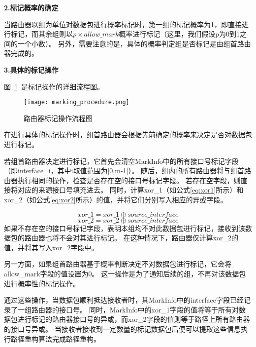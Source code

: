 \textbf{2.标记概率的确定}\par
当路由器以组为单位对数据包进行概率标记时，第一组的标记概率为1，即直接进行标记，而其余组则以$p \times allow\_mark$概率进行标记（这里，我们假设p为0到1之间的一个小数）。
另外，需要注意的是，具体的概率判定组是否标记是由组首路由器完成的。
\par

\textbf{3.具体的标记操作}\par
图~\ref{fig:marking_procedure}~是标记操作的详细流程图。
\begin{figure}[h]
  \centering
  \texttt{[image: marking\_procedure.png]}
  \caption{路由器标记操作流程图}
  \label{fig:marking_procedure}
\end{figure}  
在进行具体的标记操作时，组首路由器会根据先前确定的概率来决定是否对数据包进行标记。\par
若组首路由器决定进行标记，它首先会清空MarkInfo中的所有接口号标记字段（即interface\_i，其中i取值范围为[0,m-1]）。
随后，组内的所有路由器将与组首路由器执行相同的操作，检查是否存在空的接口号标记字段。
若存在空字段，则直接将对应的来源接口号填充进去。
同时，计算xor\_1（如公式\ref{eq:xor1}所示）和xor\_2（如公式\ref{eq:xor2}所示）的值，并将它们分别写入相应的异或字段。\par
\begin{equation}
  \label{eq:xor1}
   xor\_1 = xor\_1 \oplus source\_interface
\end{equation}
\begin{equation}
  \label{eq:xor2}
   xor\_2 = xor\_2 \oplus source\_interface
\end{equation}
如果不存在空的接口号标记字段，表明本组均不对此数据包进行标记，接收到该数据包的路由器也将不会对其进行标记。
在这种情况下，路由器仅计算xor\_2的值，并将其写入xor\_2字段中。\par

另一方面，如果组首路由器基于概率判断决定不对数据包进行标记，它会将allow\_mark字段的值设置为0。
这一操作是为了通知后续的组，不再对该数据包进行概率性的标记操作。


通过这些操作，当数据包顺利抵达接收者时，其MarkInfo中的interface字段已经记录了一组路由器的接口号。
同时，MarkInfo中的xor\_1字段的值将等于所有对数据包进行标记的路由器接口号的异或，而xor\_2字段的值则等于路径上所有路由器的接口号异或。
当接收者接收到一定数量的标记数据包后便可以提取这些信息执行路径重构算法完成路径重构。

